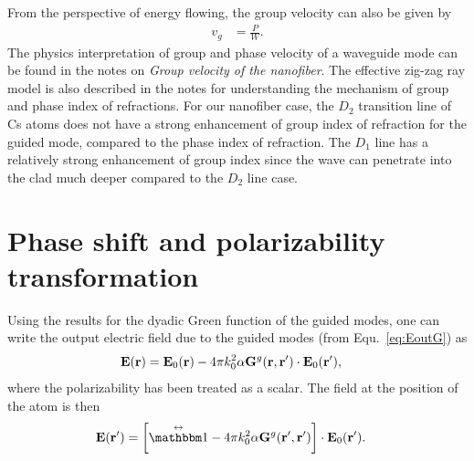 From the perspective of energy flowing, the group velocity can also be given by
\begin{align}
v_g&=\frac{P}{W}.
\end{align}
The physics interpretation of group and phase velocity of a waveguide mode can be found in the notes on \textit{Group velocity of the nanofiber}. The effective zig-zag ray model is also described in the notes for understanding the mechanism of group and phase index of refractions. For our nanofiber case, the $ D_2 $ transition line of Cs atoms does not have a strong enhancement of group index of refraction for the guided mode, compared to the phase index of refraction. The $ D_1 $ line has a relatively strong enhancement of group index since the wave can penetrate into the clad much deeper compared to the $ D_2 $ line case. 

\section{Phase shift and polarizability transformation}
Using the results for the dyadic Green function of the guided modes, one can write the output electric field due to the guided modes (from Equ.~\eqref{eq:EoutG}) as 
\begin{align}
\mathbf{E}(\mathbf{r}) & = \mathbf{E}_0(\mathbf{r}) -4\pi k_0^2 \alpha \mathbf{G}^g(\mathbf{r},\mathbf{r}')\cdot\mathbf{E}_0(\mathbf{r}'),
\end{align}
where the polarizability has been treated as a scalar. The field at the position of the atom is then
\begin{align}
\mathbf{E}(\br') &= \left[\eye-4\pi k_0^2 \alpha \mathbf{G}^g(\br',\br')\right]\cdot\mathbf{E}_0(\br').
\end{align}

